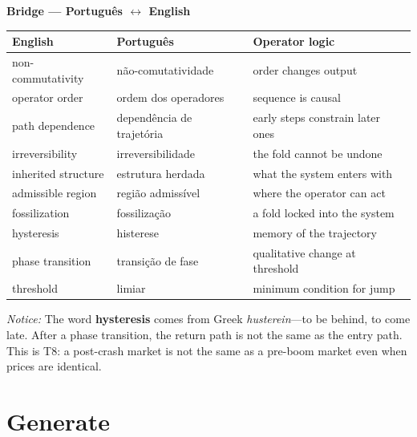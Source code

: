 \documentclass[11pt, twoside, openright]{book}
\theoremstyle{plain}
\theoremstyle{definition}
\newenvironment{bridgebox}{%
  \begin{mdframed}[backgroundcolor=BridgeBox,linecolor=green!50!black,linewidth=0.5pt,innertopmargin=6pt,innerbottommargin=6pt]
  \noindent\textbf{Bridge --- Portugu\^{e}s $\leftrightarrow$ English}\par\medskip}{\end{mdframed}}
\begin{document}
\begin{bridgebox}
\begin{tabularx}{\textwidth}{@{}LLL@{}}
\toprule
\textbf{English} & \textbf{Portugu\^{e}s} & \textbf{Operator logic} \\
\midrule
non-commutativity   & não-comutatividade        & order changes output \\
operator order      & ordem dos operadores      & sequence is causal \\
path dependence     & dependência de trajetória & early steps constrain later ones \\
irreversibility     & irreversibilidade         & the fold cannot be undone \\
inherited structure & estrutura herdada         & what the system enters with \\
admissible region   & região admissível         & where the operator can act \\
fossilization       & fossilização              & a fold locked into the system \\
hysteresis          & histerese                 & memory of the trajectory \\
phase transition    & transição de fase         & qualitative change at threshold \\
threshold           & limiar                    & minimum condition for jump \\
\bottomrule
\end{tabularx}

\medskip
\textit{Notice:} The word \textbf{hysteresis} comes from Greek
\textit{husterein}---to be behind, to come late. After a phase transition,
the return path is not the same as the entry path. This is T8: a
post-crash market is not the same as a pre-boom market even when
prices are identical.
\end{bridgebox}

\section{Generate}
\end{document}
